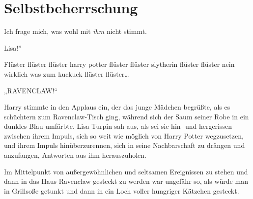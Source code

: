 \chapter{Selbstbeherrschung}

\begin{chapterOpeningQuote}
Ich frage mich, was wohl mit \emph{ihm} nicht stimmt.
\end{chapterOpeningQuote}

 Lisa!”

\hplettrineextrapara
Flüster flüster flüster harry potter flüster flüster slytherin flüster flüster nein wirklich was zum kuckuck flüster flüster…

„RAVENCLAW!“

Harry stimmte in den Applaus ein, der das junge Mädchen begrüßte, als es schüchtern zum Ravenclaw-Tisch ging, während sich der Saum seiner Robe in ein dunkles Blau umfärbte. Lisa Turpin sah aus, als sei sie hin- und hergerissen zwischen ihrem Impuls, sich so weit wie möglich von Harry Potter wegzusetzen, und ihrem Impuls hinüberzurennen, sich in seine Nachbarschaft zu drängen und anzufangen, Antworten aus ihm herauszuholen.

Im Mittelpunkt von außergewöhnlichen und seltsamen Ereignissen zu stehen und dann in das Haus Ravenclaw gesteckt zu werden war ungefähr so, als würde man in Grillsoße getunkt und dann in ein Loch voller hungriger Kätzchen gesteckt.

